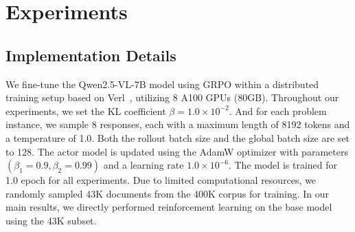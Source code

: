 

\section{Experiments}




\subsection{Implementation Details}


We fine-tune the Qwen2.5-VL-7B model using GRPO within a distributed training setup based on Verl~\cite{sheng2024hybridflow, zheng2025easyr1}, utilizing 8 A100 GPUs (80GB). Throughout our experiments, we set the KL coefficient $ \beta= 1.0 \times 10^{-2} $. And for each problem instance, we sample 8 responses, each with a maximum length of 8192 tokens and a temperature of 1.0. Both the rollout batch size and the global batch size are set to 128. The actor model is updated using the AdamW optimizer with parameters $(\beta_1 = 0.9, \beta_2 = 0.99)$ and a learning rate $1.0 \times 10^{-6}$. The model is trained for 1.0 epoch for all experiments. Due to limited computational resources, we randomly sampled 43K documents from the 400K corpus for training. In our main results, we directly performed reinforcement learning on the base model using the 43K subset.



